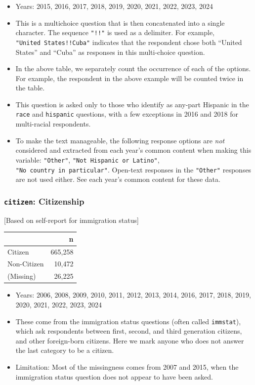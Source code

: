\documentclass[10pt,article,oneside]{memoir}
\begin{document}
\begin{itemize}
\tightlist
\item
  Years: 2015, 2016, 2017, 2018, 2019, 2020, 2021, 2022, 2023, 2024
\item
  This is a multichoice question that is then concatenated into a single
  character. The sequence \texttt{"!!"} is used as a delimiter. For
  example, \texttt{"United\ States!!Cuba"} indicates that the respondent
  chose both ``United States'' and ``Cuba'' as responses in this
  multi-choice question.
\item
  In the above table, we separately count the occurrence of each of the
  options. For example, the respondent in the above example will be
  counted twice in the table.
\item
  This question is asked only to those who identify as any-part Hispanic
  in the \texttt{race} and \texttt{hispanic} questions, with a few
  exceptions in 2016 and 2018 for multi-racial respondents.
\item
  To make the text manageable, the following response options are
  \emph{not} considered and extracted from each year's common content
  when making this variable: \texttt{"Other"},
  \texttt{"Not\ Hispanic\ or\ Latino"},
  \texttt{"No\ country\ in\ particular"}. Open-text responses in the
  \texttt{"Other"} responses are not used either. See each year's common
  content for these data.
\end{itemize}

\subsubsection{\texorpdfstring{\texttt{citizen}:
Citizenship}{citizen: Citizenship}}\label{citizen-citizenship}

{[}Based on self-report for immigration status{]}

\begin{table}[H]
\centering
\begin{tabular}[t]{lr}
\toprule
 & n\\
\midrule
Citizen & 665,258\\
Non-Citizen & 10,472\\
(Missing) & 26,225\\
\bottomrule
\end{tabular}
\end{table}

\begin{itemize}
\tightlist
\item
  Years: 2006, 2008, 2009, 2010, 2011, 2012, 2013, 2014, 2016, 2017,
  2018, 2019, 2020, 2021, 2022, 2023, 2024
\item
  These come from the immigration status questions (often called
  \texttt{immstat}), which ask respondents between first, second, and
  third generation citizens, and other foreign-born citizens. Here we
  mark anyone who does not answer the last category to be a citizen.
\item
  Limitation: Most of the missingness comes from 2007 and 2015, when the
  immigration status question does not appear to have been asked.
\end{itemize}
\end{document}
